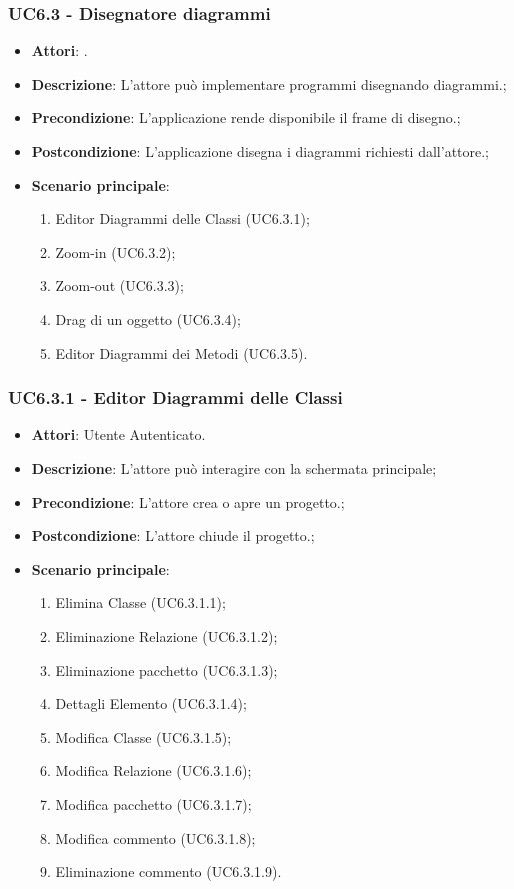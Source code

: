\subsubsection{UC6.3 - Disegnatore diagrammi} 
\label{sssec:UC6.3} 
\begin{itemize} 
\item \textbf{Attori}: .
\item \textbf{Descrizione}: L'attore può implementare programmi disegnando diagrammi.;
\item \textbf{Precondizione}: L'applicazione rende disponibile il frame di disegno.;
\item \textbf{Postcondizione}: L'applicazione disegna i diagrammi richiesti dall'attore.;
\item \textbf{Scenario principale}: \begin{enumerate}\item Editor Diagrammi delle Classi (UC6.3.1);\item Zoom-in (UC6.3.2);\item Zoom-out (UC6.3.3);\item Drag di un oggetto (UC6.3.4);\item Editor Diagrammi dei Metodi (UC6.3.5). 
 \end{enumerate}
\end{itemize} 
\subsubsection{UC6.3.1 - Editor Diagrammi delle Classi} 
\label{sssec:UC6.3.1} 
\begin{itemize} 
\item \textbf{Attori}: Utente Autenticato.
\item \textbf{Descrizione}: L'attore può interagire con la schermata principale;
\item \textbf{Precondizione}: L'attore crea o apre un progetto.;
\item \textbf{Postcondizione}: L'attore chiude il progetto.;
\item \textbf{Scenario principale}: \begin{enumerate}\item Elimina Classe (UC6.3.1.1);\item Eliminazione Relazione (UC6.3.1.2);\item Eliminazione pacchetto (UC6.3.1.3);\item Dettagli Elemento (UC6.3.1.4);\item Modifica Classe (UC6.3.1.5);\item Modifica Relazione (UC6.3.1.6);\item Modifica pacchetto (UC6.3.1.7);\item Modifica commento (UC6.3.1.8);\item Eliminazione commento (UC6.3.1.9). 
 \end{enumerate}
\end{itemize} 
